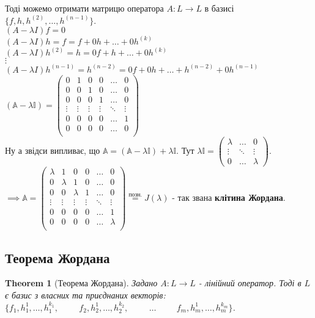 \documentclass[a4paper, 10pt]{article}
\theoremstyle{theoremdd}
\newtheorem{theorem}{Theorem}[subsection]
\theoremstyle{theoremdd}
\theoremstyle{theoremdd}
\theoremstyle{theoremdd}
\theoremstyle{theoremdd}
\theoremstyle{theoremdd}
\theoremstyle{theoremdd}
\theoremstyle{theoremdd}
\begin{document}
Тоді можемо отримати матрицю оператора $A: L \to L$ в базисі $\{f,h,h^{(2)},\dots,h^{(n-1)}\}$.\\
$(A-\lambda I)f = 0$\\
$(A-\lambda I)h = f = f + 0h + \dots + 0h^{(k)}$\\
$(A-\lambda I)h^{(2)} = h = 0f + h + \dots + 0h^{(k)}$\\
$\vdots$\\
$(A-\lambda I)h^{(n-1)} = h^{(n-2)} = 0f + 0h + \dots + h^{(n-2)} + 0h^{(n-1)}$\\
$(\mathbb{A}- \lambda \mathbb{I}) = \begin{pmatrix}
0 & 1 & 0 & 0 & \dots & 0 \\
0 & 0 & 1 & 0 & \dots & 0 \\
0 & 0 & 0 & 1 & \dots & 0 \\
\vdots & \vdots & \vdots & \vdots & \ddots & \vdots \\
0 & 0 & 0 & 0 & \dots & 1 \\
0 & 0 & 0 & 0 & \dots & 0 \\
\end{pmatrix}$\\
Ну а звідси випливає, що $\mathbb{A} = (\mathbb{A} - \lambda \mathbb{I}) + \lambda \mathbb{I}$. Тут $\lambda \mathbb{I} = \begin{pmatrix}
\lambda & \dots & 0\\
\vdots & \ddots & \vdots\\
0 & \dots & \lambda
\end{pmatrix}$.\\
$\implies \mathbb{A} = \begin{pmatrix}
\lambda & 1 & 0 & 0 & \dots & 0 \\
0 & \lambda & 1 & 0 & \dots & 0 \\
0 & 0 & \lambda & 1 & \dots & 0 \\
\vdots & \vdots & \vdots & \vdots & \ddots & \vdots \\
0 & 0 & 0 & 0 & \dots & 1 \\
0 & 0 & 0 & 0 & \dots & \lambda \\
\end{pmatrix} \overset{\textrm{позн.}}{=} J(\lambda)$ - так звана \textbf{клітина Жордана}.

\subsection{Теорема Жордана}
\begin{theorem}[Теорема Жордана]
Задано $A: L \to L$ - лінійний оператор. Тоді в $L$ є базис з власних та приєднаних векторів:\\
$\{f_1, h_1^1, \dots ,h_1^{k_1}, \hspace{1cm} f_2, h_2^1, \dots, h_2^{k_2}, \hspace{1cm} \dots \hspace{1cm} f_m, h_m^{1}, \dots, h_m^{k_m}\}$.
\end{theorem}
\end{document}
